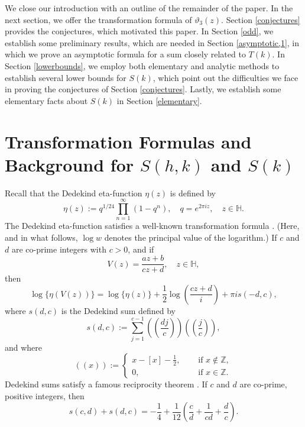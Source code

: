 \documentclass[11pt,reqno]{amsart}
\newcommand{\df}{\dfrac}
\theoremstyle{plain}
\numberwithin{equation}{section}
\begin{document}
We close our introduction with an outline of the remainder of the paper.  In the next section, we offer the transformation formula of $\vartheta_3(z)$. Section \ref{conjectures} provides the conjectures, which motivated this paper.   In Section \ref{odd}, we establish some preliminary results, which are needed in Section \ref{asymptotic,1}, in which we prove an asymptotic formula for a sum closely related to $T(k)$. In Section \ref{lowerbounds}, we employ both elementary and analytic methods to establish several lower bounds for $S(k)$, which point out the difficulties we face in proving the conjectures of Section \ref{conjectures}.  Lastly, we establish some elementary facts about $S(k)$ in Section \ref{elementary}.



\section{Transformation Formulas and Background for $S(h,k)$ and $S(k)$}\label{trans}%
 Recall that the Dedekind eta-function $\eta(z)$ is defined by
\begin{equation*}
 \eta(z):=q^{1/24}\prod_{n=1}^{\infty}(1-q^n), \quad q=e^{2\pi iz}, \quad z\in \mathbb{H}.
 \end{equation*}
 The Dedekind eta-function satisfies  a well-known transformation formula
\cite[p.~145]{rademacher}.   (Here, and in what follows, $\log w$ denotes the principal value of the logarithm.) If $c$ and $d$ are co-prime integers with $c>0$, and if
$$V(z)=\df{az+b}{cz+d},\quad z \in\mathbb{H},$$
then
\begin{equation*}
\log\{\eta(V(z))\}=\log\{\eta(z)\}+\df{1}{2}\log\left(\df{cz+d}{i}\right)+\pi i s(-d,c),
\end{equation*}
where $s(d,c)$ is  the Dedekind sum defined by
\begin{equation*}
s(d,c):=\sum_{j=1}^{c-1}\left(\left(\df{dj}{c}\right)\right)\left(\left(\df{j}{c}\right)\right),
\end{equation*}
and where
\begin{equation*}
((x)):=\begin{cases} x-[x]-\tfrac12, \quad&\text{ if } x\notin \mathbb{Z},\\
0,&\text{ if } x\in \mathbb{Z}.
\end{cases}
\end{equation*}
Dedekind sums satisfy a famous reciprocity theorem \cite[p.~4, Theorem 1]{rg}.  If $c$ and $d$ are co-prime, positive integers, then
\begin{equation}\label{reciprocity2}
s(c,d)+s(d,c)=-\df14 +\df{1}{12}\left(\df{c}{d}+\df{1}{cd}+\df{d}{c}\right).
\end{equation}
\end{document}

